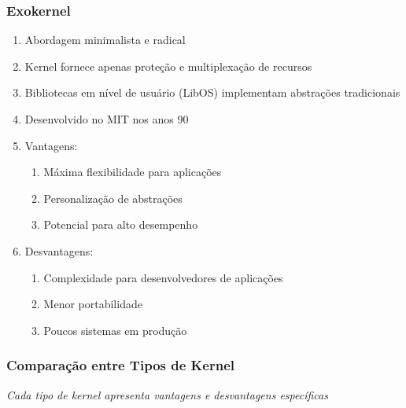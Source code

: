 \documentclass{beamer}
\begin{document}
\begin{frame}[fragile]
\frametitle{Exokernel}

\begin{enumerate}\small
    \item Abordagem minimalista e radical
    \item Kernel fornece apenas proteção e multiplexação de recursos
    \item Bibliotecas em nível de usuário (LibOS) implementam abstrações tradicionais
    \item Desenvolvido no MIT nos anos 90 \cite{engler1995exokernel}
    \item Vantagens:
    \begin{enumerate}\footnotesize
        \item Máxima flexibilidade para aplicações
        \item Personalização de abstrações
        \item Potencial para alto desempenho
    \end{enumerate}
    \item Desvantagens:
    \begin{enumerate}\footnotesize
        \item Complexidade para desenvolvedores de aplicações
        \item Menor portabilidade
        \item Poucos sistemas em produção
    \end{enumerate}
\end{enumerate}
\end{frame}

\begin{frame}[fragile]
\frametitle{Comparação entre Tipos de Kernel}

\begin{center}
\end{center}

\vfill
\begin{center}
    \textit{Cada tipo de kernel apresenta vantagens e desvantagens específicas \cite{tanenbaum2015modern}}
\end{center}
\end{frame}
\end{document}

